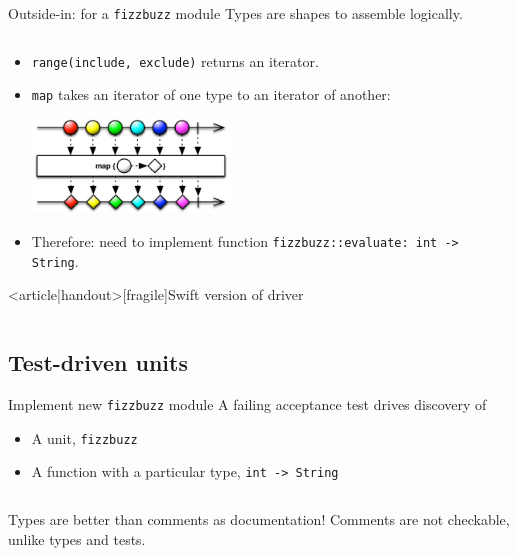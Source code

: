\begin{frame}[fragile]{Outside-in: for a \texttt{fizzbuzz} module}
  Types are shapes to assemble logically.

  \inputminted{rust}{Main4.rs}

  \begin{itemize}
  \item \texttt{range(include, exclude)} returns an \alert{iterator}.
  \item \texttt{map} takes an iterator of one type to an iterator of another:
  \begin{center}
    \includegraphics[height=2.5cm]{map.png}
  \end{center}
  \item Therefore: need to implement function \texttt{fizzbuzz::evaluate: int -> String}.
  \end{itemize}
\end{frame}

\begin{frame}<article|handout>[fragile]{Swift version of driver}
  \inputminted{swift}{Main4.swift}
\end{frame}

\subsection{Test-driven units}

\begin{frame}[fragile]{Implement new \texttt{fizzbuzz} module}
  A failing acceptance test drives \alert{discovery} of
  \begin{itemize}
  \item A \alert{unit}, \texttt{fizzbuzz}
  \item A function with a particular type,
    \texttt{int -> String}
  \end{itemize}

  \inputminted{rust}{FizzBuzz1.rs}

  \begin{block}{\alert{Types} are better than \alert{comments} as \alert{documentation}!}
    Comments are not checkable, unlike types and tests.
  \end{block}
\end{frame}

